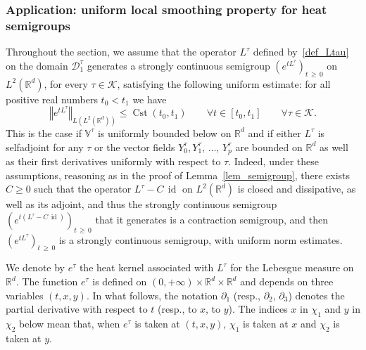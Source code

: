 \documentclass[10pt]{amsart}
\theoremstyle{definition}\newtheorem{defi}[theo]{Definition}\newtheorem{rema}[theo]{Remark}\newtheorem{exam}[theo]{Example}\newtheorem{exem}[theo]{Example}\newtheorem{nota}[theo]{Notation}
\newcommand*\R{\mathbb{R}}
\newcommand{\bbV}{\mathbb{V}}
\newcommand{\calK}{\mathcal{K}}
\newcommand{\calD}{\mathcal{D}}
\DeclareMathOperator{\Cst}{Cst}
\DeclareMathOperator{\id}{id}
\renewcommand{\geq}{\geqslant}
\renewcommand{\leq}{\leqslant}
\let\oldforall\forall
\renewcommand*{\forall}{\mathrel{\oldforall}}
\begin{document}
\subsubsection{Application: uniform local smoothing property for heat semigroups}\label{sec:localregheat}
Throughout the section, we assume that the operator $L^\tau$ defined by~\eqref{def_Ltau} on the domain $\calD^\tau_1$ generates a strongly continuous semigroup $(e^{tL^\tau})_{t\,\geq \,0}$ on $L^2(\R^d)$, for every $\tau\in\calK$, satisfying the following uniform estimate: for all positive real numbers $t_0<t_1$ we have
\begin{equation}\label{uniformestimatesemigroup0}
\left\Vert e^{tL^\tau} \right\Vert_{L\left(L^2\left(\R^d\right)\right)}\leq\Cst(t_0,t_1) \qquad\forall t\in[t_0,t_1]\qquad \forall \tau\in\calK.
\end{equation}
This is the case if $\bbV^\tau$ is uniformly bounded below on $\R^d$ and if either $L^\tau$ is selfadjoint for any $\tau$ or the vector fields $Y_0^\tau,Y_1^\tau,\,\ldots,\,Y_p^\tau$ are bounded on $\R^d$ as well as their first derivatives uniformly with respect to $\tau$. Indeed, under these assumptions, reasoning as in the proof of Lemma~\ref{lem_semigroup}, there exists $C\geq 0$ such that the operator $L^\tau-C\,\id$ on $L^2(\R^d)$ is closed and dissipative, as well as its adjoint, and thus the strongly continuous semigroup $(e^{t(L^\tau-C\,\id)})_{t\,\geq\,0}$ that it generates is a contraction semigroup, and then $(e^{tL^\tau})_{t\,\geq\,0}$ is a strongly continuous semigroup, with uniform norm estimates.

We denote by $e^\tau$ the heat kernel associated with $L^\tau$ for the Lebesgue measure on $\R^d$. The function $e^\tau$ is defined on $(0,+\infty)\times\R^d\times\R^d$ and depends on three variables $(t,x,y)$. In what follows, the notation $\partial_1$ (resp., $\partial_2$, $\partial_3$) denotes the partial derivative with respect to $t$ (resp., to $x$, to $y$). The indices $x$ in $\chi_1$ and $y$ in $\chi_2$ below mean that, when $e^\tau$ is taken at $(t,x,y)$, $\chi_1$ is taken at $x$ and $\chi_2$ is taken at $y$.
\end{document}
